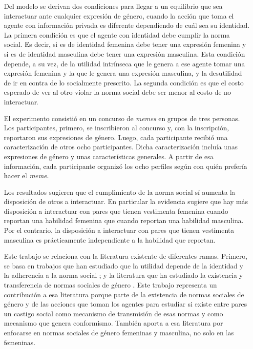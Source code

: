 Del modelo se derivan dos condiciones para llegar a un equilibrio que sea interactuar ante cualquier expresión de género, cuando la acción que toma el agente con información privada es diferente dependiendo de cuál sea su identidad. La primera condición es que el agente con identidad debe cumplir la norma social. Es decir, si es de identidad femenina debe tener una expresión femenina y si es de identidad masculina debe tener una expresión masculina. Esta condición depende, a su vez, de la utilidad intrínseca que le genera a ese agente tomar una expresión femenina y la que le genera una expresión masculina, y la desutilidad de ir en contra de lo socialmente prescrito. La segunda condición es que el costo esperado de ver al otro violar la norma social debe ser menor al costo de no interactuar. 

El experimento consistió en un concurso de \textit{memes} en grupos de tres personas. Los participantes, primero, se inscribieron al concurso y, con la inscripción, reportaron sus expresiones de género. Luego, cada participante recibió una caracterización de otros ocho participantes. Dicha caracterización incluía unas expresiones de género y unas características generales. A partir de esa información, cada participante organizó los ocho perfiles según con quién prefería hacer el \textit{meme}. 

Los resultados sugieren que el cumplimiento de la norma social sí aumenta la disposición de otros a interactuar. En particular la evidencia sugiere que hay más disposición a interactuar con pares que tienen vestimenta femenina cuando reportan una habilidad femenina que cuando reportan una habilidad masculina. Por el contrario, la disposición a interactuar con pares que tienen vestimenta masculina es prácticamente independiente a la habilidad que reportan. 

Este trabajo se relaciona con la literatura existente de diferentes ramas. Primero, se basa en trabajos que han estudiado que la utilidad depende de la identidad y la adherencia a la norma social \citep{akerlof2000economics,bernheim1994theory,fang2005dysfunctional}; y la literatura que ha estudiado la existencia y transferencia de normas sociales de género \citep{giuliano2017gender, lundborg2017childrencareer, bertrand2015genderandincome, nollenberger2016mathgap, kleven2018children}. Este trabajo representa un contribución a esa literatura porque parte de la existencia de normas sociales de género y de las acciones que toman los agentes para estudiar si existe entre pares un castigo social como mecanismo de transmisión de esas normas y como mecanismo que genera conformismo. También aporta a esa literatura por enfocarse en normas sociales de género femeninas y masculina, no solo en las femeninas. 

